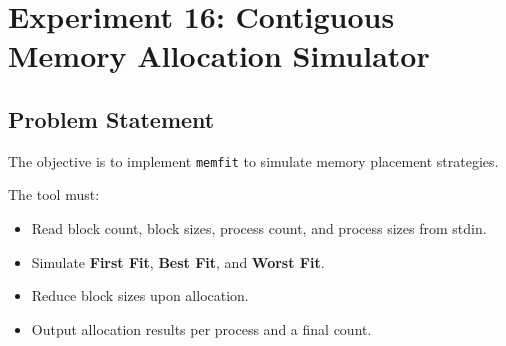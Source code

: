 
\section{Experiment 16: Contiguous Memory Allocation Simulator}

\subsection{Problem Statement}
The objective is to implement \texttt{memfit} to simulate memory placement strategies.

The tool must:
\begin{itemize}
    \item Read block count, block sizes, process count, and process sizes from stdin.
    \item Simulate \textbf{First Fit}, \textbf{Best Fit}, and \textbf{Worst Fit}.
    \item Reduce block sizes upon allocation.
    \item Output allocation results per process and a final count.
\end{itemize}

